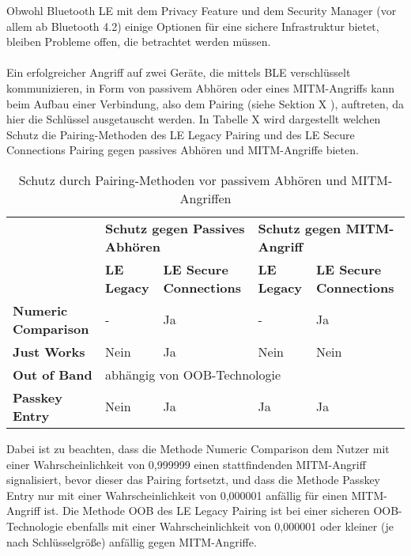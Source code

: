 Obwohl Bluetooth LE mit dem Privacy Feature und dem Security Manager (vor allem ab Bluetooth 4.2) einige Optionen für eine sichere Infrastruktur bietet, bleiben Probleme offen, die betrachtet werden müssen.
\\\\
Ein erfolgreicher Angriff auf zwei Geräte, die mittels BLE verschlüsselt kommunizieren, in Form von passivem Abhören oder eines MITM-Angriffs kann beim Aufbau einer Verbindung, also dem Pairing (siehe Sektion X 
), auftreten, da hier die Schlüssel ausgetauscht werden. In Tabelle X 
wird dargestellt welchen Schutz die Pairing-Methoden des LE Legacy Pairing und des LE Secure Connections Pairing gegen passives Abhören und MITM-Angriffe bieten.

\begin{table}
    \begin{tabularx}{\textwidth}{|p{2.8cm}|p{2cm}|p{3cm}|p{2cm}|p{3cm}|}
        \hline
        & \multicolumn{2}{|X|}{\textbf{Schutz gegen Passives Abhören}} & \multicolumn{2}{|X|}{\textbf{Schutz gegen MITM-Angriff}} \\
        & \textbf{LE Legacy} & \textbf{LE Secure Connections} & \textbf{LE Legacy} & \textbf{LE Secure Connections} \\
        \hline
        \textbf{Numeric Comparison} & - & Ja & - & Ja \\
        \hline
        \textbf{Just Works} & Nein & Ja & Nein & Nein \\
        \hline
        \textbf{Out of Band} & \multicolumn{4}{|l|}{abhängig von OOB-Technologie} \\
        \hline
        \textbf{Passkey Entry} & Nein & Ja & Ja & Ja \\
        \hline
    \end{tabularx}
    \caption{Schutz durch Pairing-Methoden vor passivem Abhören und MITM-Angriffen}
\end{table}

Dabei ist zu beachten, dass die Methode Numeric Comparison dem Nutzer mit einer Wahrscheinlichkeit von 0,999999 einen stattfindenden MITM-Angriff signalisiert, bevor dieser das Pairing fortsetzt, und dass die Methode Passkey Entry nur mit einer Wahrscheinlichkeit von 0,000001 anfällig für einen MITM-Angriff ist. Die Methode OOB des LE Legacy Pairing ist bei einer sicheren OOB-Technologie ebenfalls mit einer Wahrscheinlichkeit von 0,000001 oder kleiner (je nach Schlüsselgröße) anfällig gegen MITM-Angriffe.

